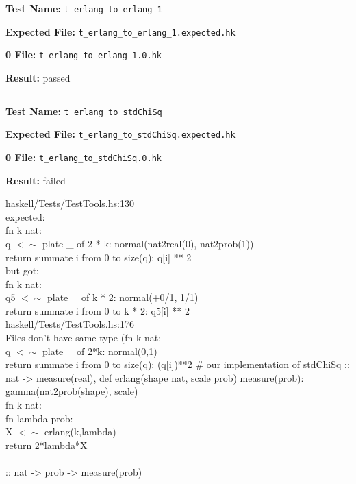 \documentclass[11pt]{article}
\begin{document}
\bigskip
\textbf{Test Name:} {\tt t\_erlang\_to\_erlang\_1}

\textbf{Expected File:} {\tt t\_erlang\_to\_erlang\_1.expected.hk}

\bigskip


\bigskip
\textbf{0 File:} {\tt t\_erlang\_to\_erlang\_1.0.hk}

\bigskip


\bigskip
\textbf{Result:} passed

\bigskip
\hrule

\bigskip
\textbf{Test Name:} {\tt t\_erlang\_to\_stdChiSq}

\textbf{Expected File:} {\tt t\_erlang\_to\_stdChiSq.expected.hk}

\bigskip


\bigskip
\textbf{0 File:} {\tt t\_erlang\_to\_stdChiSq.0.hk}

\bigskip


\bigskip
\textbf{Result:} failed

\bigskip
\noindent
haskell/Tests/TestTools.hs:130\\expected:\\fn k nat:\\q $<\sim$ plate \_ of 2 * k: normal(nat2real(0), nat2prob(1))\\return summate i from 0 to size(q): q[i] ** 2\\but got:\\fn k nat:\\q5 $<\sim$ plate \_ of k * 2: normal(+0/1, 1/1)\\return summate i from 0 to k * 2: q5[i] ** 2\\

\bigskip
\noindent
haskell/Tests/TestTools.hs:176\\Files don't have same type (fn k nat:\\ q $<\sim$ plate \_ of 2*k: normal(0,1)\\    return summate i from 0 to size(q): (q[i])**2   \# our implementation of stdChiSq :: nat -> measure(real), def erlang(shape nat, scale prob) measure(prob):\\   gamma(nat2prob(shape), scale)\\fn k nat:\\  fn lambda prob:\\       X $<\sim$ erlang(k,lambda)\\        return 2*lambda*X\\\\ :: nat -> prob -> measure(prob)\\
\end{document}
